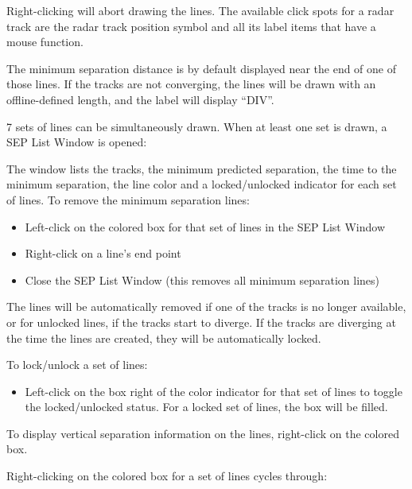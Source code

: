 \documentclass[a4paper,oneside,11pt]{memoir}
\begin{document}
\bigskip

Right-clicking will abort drawing the lines. The available click spots for a radar track are the radar track position symbol and all its label items that have a mouse function.

\bigskip

The minimum separation distance is by default displayed near the end of one of those lines. If the tracks are not converging, the lines will be drawn with an offline-defined length, and the label will display “DIV”.

\bigskip

7 sets of lines can be simultaneously drawn. When at least one set is drawn, a SEP List Window is opened:

\bigskip


The window lists the tracks, the minimum predicted separation, the time to the minimum separation, the line color and a locked/unlocked indicator for each set of lines.
To remove the minimum separation lines:

\begin{itemize}
    \item Left-click on the colored box for that set of lines in the SEP List Window
    \item Right-click on a line’s end point
    \item Close the SEP List Window (this removes all minimum separation lines)
\end{itemize}

The lines will be automatically removed if one of the tracks is no longer available, or for unlocked lines, if the tracks start to diverge. If the tracks are diverging at the time the lines are created, they will be automatically locked.

\bigskip

To lock/unlock a set of lines:

\begin{itemize}
    \item Left-click on the box right of the color indicator for that set of lines to toggle the locked/unlocked status. For a locked set of lines, the box will be filled.
\end{itemize}

\bigskip

To display vertical separation information on the lines, right-click on the colored box.

Right-clicking on the colored box for a set of lines cycles through:
\end{document}
